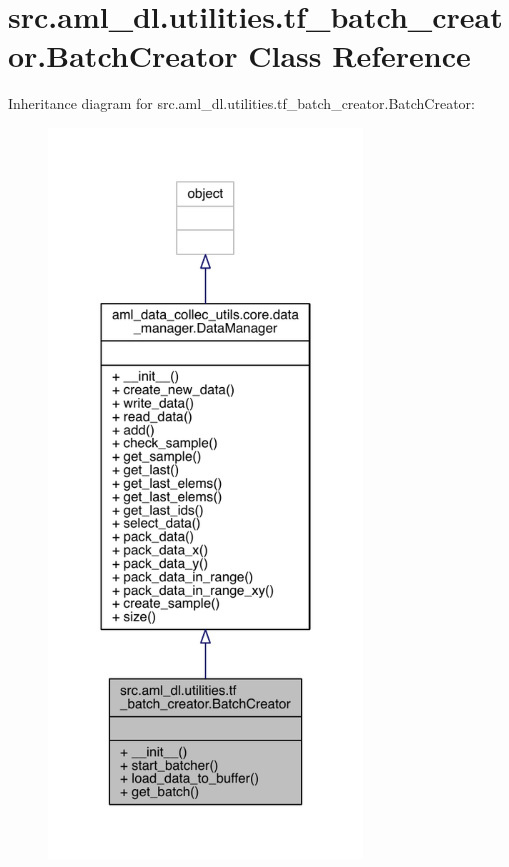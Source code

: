 \hypertarget{classsrc_1_1aml__dl_1_1utilities_1_1tf__batch__creator_1_1_batch_creator}{}\section{src.\+aml\+\_\+dl.\+utilities.\+tf\+\_\+batch\+\_\+creator.\+Batch\+Creator Class Reference}
\label{classsrc_1_1aml__dl_1_1utilities_1_1tf__batch__creator_1_1_batch_creator}


Inheritance diagram for src.\+aml\+\_\+dl.\+utilities.\+tf\+\_\+batch\+\_\+creator.\+Batch\+Creator\+:\nopagebreak
\begin{figure}[H]
\begin{center}
\leavevmode
\includegraphics[width=236pt]{classsrc_1_1aml__dl_1_1utilities_1_1tf__batch__creator_1_1_batch_creator__inherit__graph}
\end{center}
\end{figure}



